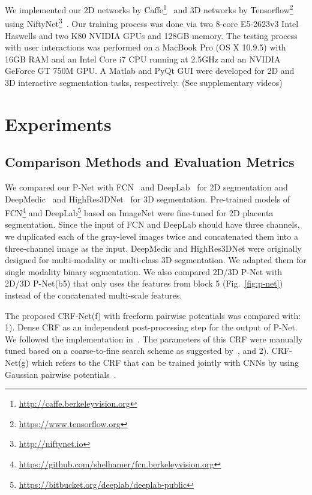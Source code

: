 \documentclass[10pt,journal,compsoc]{IEEEtran}
\begin{document}
We implemented our 2D networks by Caffe\footnote{\url{http://caffe.berkeleyvision.org}}~\cite{Jia2014} and 3D networks by Tensorflow\footnote{\url{https://www.tensorflow.org}}~\cite{Abadi2016} using NiftyNet\footnote{\url{http://niftynet.io}}~\cite{Li2017}. Our training process was done via two 8-core E5-2623v3 Intel Haswells and two K80 NVIDIA GPUs and 128GB memory. The testing process with user interactions was performed on a MacBook Pro (OS X 10.9.5) with 16GB RAM and an Intel Core i7 CPU running at 2.5GHz and an NVIDIA
GeForce GT 750M GPU. A Matlab and PyQt GUI were developed for 2D and 3D interactive segmentation tasks, respectively.
(See supplementary videos)
\section{Experiments}
\subsection{Comparison Methods and Evaluation Metrics}
We compared our P-Net with FCN~\cite{Long2014} and DeepLab~\cite{Chen2016deeplab} for 2D segmentation and DeepMedic~\cite{Kamnitsas2017} and HighRes3DNet~\cite{Li2017} for 3D segmentation. Pre-trained models of FCN\footnote{\url{https://github.com/shelhamer/fcn.berkeleyvision.org}} and DeepLab\footnote{\url{https://bitbucket.org/deeplab/deeplab-public}} based on ImageNet were fine-tuned for 2D placenta segmentation. %
Since the input of FCN and DeepLab should have three channels, we duplicated each of the gray-level images twice and concatenated them into a three-channel image as the input. DeepMedic and HighRes3DNet were originally designed for multi-modality or multi-class 3D segmentation. We adapted them for single modality binary segmentation. We also compared 2D/3D P-Net with 2D/3D P-Net(b5) that only uses the features from block 5 (Fig.~\ref{fig:p-net}) instead of the concatenated multi-scale features. 


The proposed CRF-Net(f) with freeform pairwise potentials was compared with: 1). Dense CRF as an independent post-processing step for the  output of P-Net. We followed the implementation  in~\cite{Krahenbuhl2011, Chen2016deeplab, Kamnitsas2017}.
The parameters of this CRF were manually tuned based on a coarse-to-fine search scheme as suggested by~\cite{Chen2016deeplab}, and 2). CRF-Net(g) which refers to the CRF that can be trained jointly with CNNs by using Gaussian pairwise potentials~\cite{Zheng2015a}.
\end{document}
